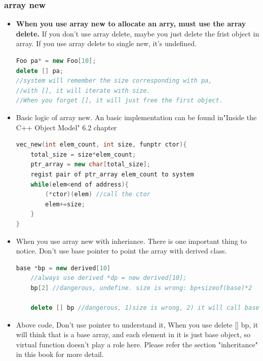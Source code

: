 \documentclass[a4paper,12pt,twoside]{book}
\begin{document}
\subsubsection{array new}
\begin{itemize}
	\item \textbf{When you use array new to allocate an arry, must use the array delete.} If you don't use array delete, maybe you just delete the frist object in array. If you use array delete to single new, it's undefined. 
\begin{lstlisting}[frame=single, language=c++]
Foo pa* = new Foo[10];
delete [] pa;
//system will remember the size corresponding with pa, 
//with [], it will iterate with size. 
//When you forget [], it will just free the first object.
\end{lstlisting}
	\item Basic logic of array new. An basic implementation can be found in"Inside the C++ Object Model" 6.2 chapter
\begin{lstlisting}[frame=single, language=c++]
vec_new(int elem_count, int size, funptr ctor){
	total_size = size*elem_count;
	ptr_array = new char[total_size];
	regist pair of ptr_array elem_count to system
	while(elem<end of address){
		(*ctor)(elem) //call the ctor
		elem+=size;
	}
}
	\end{lstlisting}
	\item When you use array new with inheriance. There is one important thing to notice. Don't use base pointer to point the array with derived class. 
	\begin{lstlisting}[frame=single, language=c++]
	base *bp = new derived[10]
	//always use derived *dp = new derived[10];
	bp[2] //dangerous, undefine. size is wrong: bp+sizeof(base)*2
	
	delete [] bp //dangerous, 1)size is wrong, 2) it will call base::~base() destructor. 
	\end{lstlisting}
	\item Above code, Don't use pointer to understand it, When you use delete [] bp, it will think that is a base array, and each element in it is just base object, so virtual function doesn't play a role here. Please refer the section "inheritance" in this book for more detail.
\end{itemize}
\end{document}
